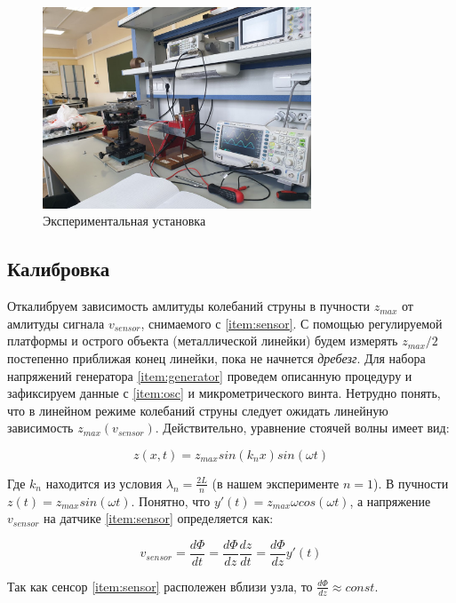 \documentclass{article}
\begin{document}
\begin{figure}[h]
    \centering
    \includegraphics[width=8cm]{drawings/lab-setup.png}
    \caption{Экспериментальная установка}
    \label{fig:lab-setup}
\end{figure}

\subsection{Калибровка}

Откалибруем зависимость амлитуды колебаний струны в пучности $z_{max}$ от амлитуды сигнала $v_{sensor}$, снимаемого с \ref{item:sensor}.
С помощью регулируемой платформы и острого объекта (металлической линейки) будем измерять $z_{max}/2$ постепенно приближая
конец линейки, пока не начнется \textit{дребезг}. Для набора напряжений генератора \ref{item:generator} проведем описанную процедуру
и зафиксируем данные с \ref{item:osc} и микрометрического винта. Нетрудно понять, что в линейном режиме колебаний струны следует ожидать
линейную зависимость $z_{max}(v_{sensor})$. Действительно, уравнение стоячей волны имеет вид:

\begin{equation}
    z(x, t) = z_{max} sin(k_n x) sin(\omega t)
\end{equation}

Где $k_n$ находится из условия $\lambda_n = \frac{2 L}{n}$ (в нашем эксперименте $n = 1$).
В пучности $z(t) = z_{max} sin(\omega t)$. Понятно, что $y'(t) = z_{max} \omega cos(\omega t)$, а напряжение $v_{sensor}$
на датчике \ref{item:sensor} определяется как:

\begin{equation}
    v_{sensor} = \frac{d \Phi}{dt} = \frac{d \Phi}{dz} \frac{dz}{dt} = \frac{d \Phi}{dz} y'(t)
\end{equation}

Так как сенсор \ref{item:sensor} располежен вблизи узла, то $\frac{d \Phi}{dz} \approx const$.
\end{document}
